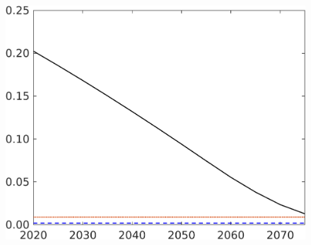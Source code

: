\begin{figure}[h!!]
\begin{minipage}[]{0.32\textwidth}
\end{minipage}
\begin{minipage}[]{0.32\textwidth}
	\includegraphics[width=1\textwidth]{../../codding_model/own_basedOnFried/optimalPol_elastS_DisuSci/figures/all_1705/Extern_CompEff_sff_spillover0_noskill0_sep1_BN0_ineq0_red0_etaa0.79_lgd0.png}
\end{minipage}

\end{figure}

